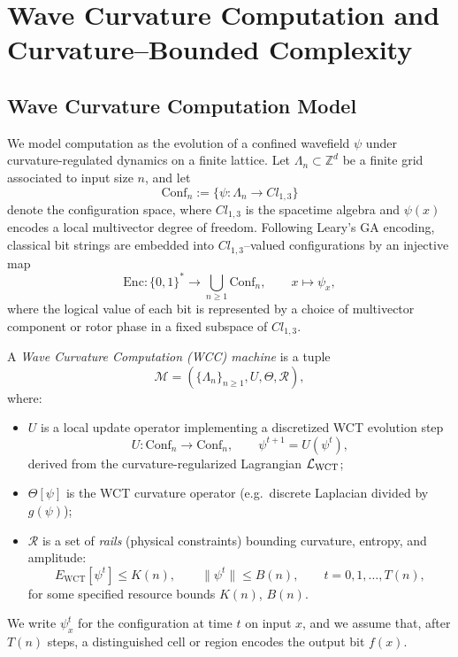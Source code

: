 \documentclass[12pt]{article}
\theoremstyle{remark}
\begin{document}
\section{Wave Curvature Computation and Curvature--Bounded Complexity}

\subsection{Wave Curvature Computation Model}

We model computation as the evolution of a confined wavefield
$\psi$ under curvature-regulated dynamics on a finite lattice.
Let $\Lambda_n \subset \mathbb{Z}^d$ be a finite grid associated to
input size $n$, and let
\begin{equation}
    \mathrm{Conf}_n
    := \bigl\{
        \psi:\Lambda_n \to Cl_{1,3}
       \bigr\}
\end{equation}
denote the configuration space, where $Cl_{1,3}$ is the spacetime
algebra and $\psi(x)$ encodes a local multivector degree of freedom.
Following Leary's GA encoding, classical bit strings are embedded into
$Cl_{1,3}$--valued configurations by an injective map
\begin{equation}
    \mathrm{Enc}:\{0,1\}^* \to \bigcup_{n\ge 1}\mathrm{Conf}_n,
    \qquad
    x \mapsto \psi_x,
\end{equation}
where the logical value of each bit is represented by a choice of
multivector component or rotor phase in a fixed subspace of $Cl_{1,3}$.

A \emph{Wave Curvature Computation (WCC) machine} is a tuple
\begin{equation}
    \mathcal{M}
    = (\{\Lambda_n\}_{n\ge 1}, U, \Theta, \mathcal{R}),
\end{equation}
where:
\begin{itemize}
    \item $U$ is a local update operator implementing a discretized
          WCT evolution step
          \[
            U:\mathrm{Conf}_n \to \mathrm{Conf}_n,
            \qquad
            \psi^{t+1} = U(\psi^t),
          \]
          derived from the curvature-regularized Lagrangian
          $\mathcal{L}_{\rm WCT}$;
    \item $\Theta[\psi]$ is the WCT curvature operator
          (e.g.\ discrete Laplacian divided by $g(\psi)$);
    \item $\mathcal{R}$ is a set of \emph{rails} (physical constraints)
          bounding curvature, entropy, and amplitude:
          \[
            E_{\text{WCT}}[\psi^t] \le K(n),
            \qquad
            \|\psi^t\| \le B(n),
            \qquad
            t=0,1,\dots,T(n),
          \]
          for some specified resource bounds $K(n)$, $B(n)$.
\end{itemize}
We write $\psi^t_x$ for the configuration at time $t$ on input
$x$, and we assume that, after $T(n)$ steps, a distinguished cell or
region encodes the output bit $f(x)$.
\end{document}
